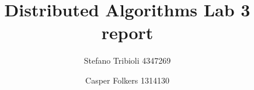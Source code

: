 \documentclass{article}
\begin{document}
\title{Distributed Algorithms Lab 3 report}
\author{Stefano Tribioli 4347269  \and Casper Folkers 1314130}
\maketitle



\end{document}
